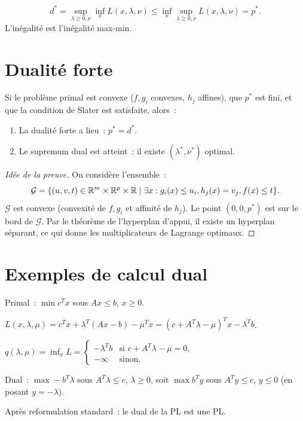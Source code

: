\begin{formules}[title=\textbf{Relation primal--dual}]
\[
    d^* = \sup_{\lambda \geq 0, \nu} \inf_x L(x,\lambda,\nu)
    \leq \inf_x \sup_{\lambda \geq 0, \nu} L(x,\lambda,\nu) = p^*.
\]
L'in\'egalit\'e est l'in\'egalit\'e max-min.
\end{formules}

\section{Dualit\'e forte}

\begin{theoreme}
\label{thm:slater}
Si le probl\`eme primal est convexe ($f, g_i$ convexes, $h_j$ affines), que $p^*$
est fini, et que la condition de Slater est satisfaite, alors~:
\begin{enumerate}
    \item La dualit\'e forte a lieu~: $p^* = d^*$.
    \item Le supremum dual est atteint~: il existe $(\lambda^*, \nu^*)$ optimal.
\end{enumerate}
\end{theoreme}

\begin{proof}[Id\'ee de la preuve]
On consid\`ere l'ensemble~:
\[
    \mathcal{G} = \{(u, v, t) \in \mathbb{R}^m \times \mathbb{R}^p \times \mathbb{R} \mid
    \exists x : g_i(x) \leq u_i, h_j(x) = v_j, f(x) \leq t\}.
\]
$\mathcal{G}$ est convexe (convexit\'e de $f, g_i$ et affinit\'e de $h_j$).
Le point $(0, 0, p^*)$ est sur le bord de $\mathcal{G}$. Par le th\'eor\`eme de
l'hyperplan d'appui, il existe un hyperplan s\'eparant, ce qui donne les
multiplicateurs de Lagrange optimaux.
\end{proof}

\section{Exemples de calcul dual}

\begin{exemple}
Primal~: $\min c^Tx$ sous $Ax \leq b$, $x \geq 0$.

$L(x, \lambda, \mu) = c^Tx + \lambda^T(Ax - b) - \mu^Tx = (c + A^T\lambda - \mu)^Tx - \lambda^Tb$.

$q(\lambda, \mu) = \inf_x L = \begin{cases} -\lambda^Tb & \text{si } c + A^T\lambda - \mu = 0, \\ -\infty & \text{sinon.}\end{cases}$

Dual~: $\max -b^T\lambda$ sous $A^T\lambda \leq c$, $\lambda \geq 0$,
soit $\max b^T y$ sous $A^T y \leq c$, $y \leq 0$ (en posant $y = -\lambda$).

Apr\`es reformulation standard~: le dual de la PL est une PL.
\end{exemple}

